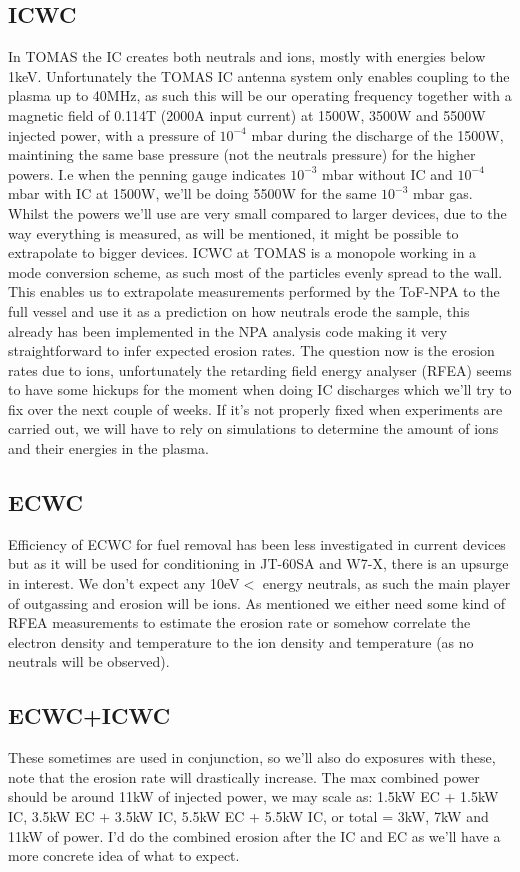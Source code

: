 \documentclass{article}
\begin{document}
\subsection{ICWC}
In TOMAS the IC creates both neutrals and ions, mostly with energies below
1keV.  Unfortunately the TOMAS IC antenna system only enables coupling to the
plasma up to 40MHz, as such this will be our operating frequency together with
a magnetic field of 0.114T (2000A input current) at 1500W, 3500W and 5500W
injected power, with a pressure of $10^{-4}$ mbar during the discharge of the
1500W, maintining the same base pressure (not the neutrals pressure) for the
higher powers. I.e when the penning gauge indicates $10^{-3}$ mbar without IC
and $10^{-4}$ mbar with IC at 1500W, we'll be doing 5500W for the same
$10^{-3}$ mbar gas. Whilst the powers we'll use are very small compared to
larger devices, due to the way everything is measured, as will be mentioned, it
might be possible to extrapolate to bigger devices.  ICWC at TOMAS is a
monopole working in a mode conversion scheme, as such most of the particles
evenly spread to the wall.  This enables us to extrapolate measurements
performed by the ToF-NPA to the full vessel and use it as a prediction on how
neutrals erode the sample, this already has been implemented in the NPA
analysis code making it very straightforward to infer expected erosion rates.
The question now is the erosion rates due to ions, unfortunately the retarding
field energy analyser (RFEA) seems to have some hickups for the moment when
doing IC discharges which we'll try to fix over the next couple of weeks.  If
it's not properly fixed when experiments are carried out, we will have to rely
on simulations to determine the amount of ions and their energies in the
plasma.
\subsection{ECWC}
Efficiency of ECWC for fuel removal has been less investigated in current
devices but as it will be used for conditioning in JT-60SA and W7-X, there is
an upsurge in interest. We don't expect any 10eV$<$ energy neutrals, as such
the main player of outgassing and erosion will be ions.  As mentioned we either
need some kind of RFEA measurements to estimate the erosion rate or somehow
correlate the electron density and temperature to the ion density and
temperature (as no neutrals will be observed).
\subsection{ECWC+ICWC}
These sometimes are used in conjunction, so we'll also do exposures with these,
note that the erosion rate will drastically increase. The max combined power
should be around 11kW of injected power, we may scale as: 1.5kW EC + 1.5kW IC,
3.5kW EC + 3.5kW IC, 5.5kW EC + 5.5kW IC, or total = 3kW, 7kW and 11kW of
power.  I'd do the combined erosion after the IC and EC as we'll have a more
concrete idea of what to expect.
\end{document}
